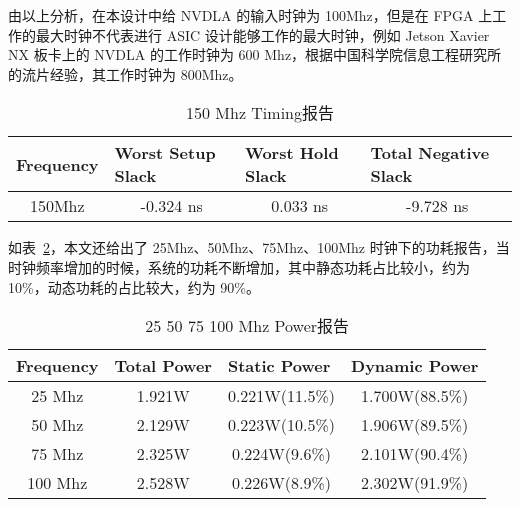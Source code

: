 由以上分析，在本设计中给 NVDLA 的输入时钟为 100Mhz，但是在 FPGA 上工作的最大时钟不代表进行 ASIC 设计能够工作的最大时钟，例如 Jetson Xavier NX 板卡上的 NVDLA 的工作时钟为 600 Mhz，根据中国科学院信息工程研究所的流片经验，其工作时钟为 800Mhz。

\begin{table}[!htbp]
    \caption{150 Mhz Timing报告}
    \label{tab:150 Mhz Timing}
    \centering
    \footnotesize%
    \setlength{\tabcolsep}{4pt}%
    \renewcommand{\arraystretch}{1.2}%
    \begin{tabular}{llll}
        \toprule
        \textbf{Frequency}         & \textbf{Worst Setup Slack}    & \textbf{Worst Hold Slack}    & \textbf{Total Negative Slack} \\
        \midrule
        \multicolumn{1}{c}{150Mhz} & \multicolumn{1}{c}{-0.324 ns} & \multicolumn{1}{c}{0.033 ns} & \multicolumn{1}{c}{-9.728 ns} \\
        \bottomrule                   
    \end{tabular}
\end{table}

如表~\ref{tab:25-100 Mhz Power}，本文还给出了 25Mhz、50Mhz、75Mhz、100Mhz 时钟下的功耗报告，当时钟频率增加的时候，系统的功耗不断增加，其中静态功耗占比较小，约为 10\%，动态功耗的占比较大，约为 90\%。

\begin{table}[!htbp]
    \caption{25 50 75 100 Mhz Power报告}
    \label{tab:25-100 Mhz Power}
    \centering
    \footnotesize%
    \setlength{\tabcolsep}{4pt}%
    \renewcommand{\arraystretch}{1.2}%
    \begin{tabular}{cccc}
        \toprule
        \multicolumn{1}{l}{\textbf{Frequency}} & \multicolumn{1}{l}{\textbf{Total Power}} & \multicolumn{1}{l}{\textbf{Static Power}} & \multicolumn{1}{l}{\textbf{Dynamic Power}} \\
        \midrule
        25 Mhz                                 & 1.921W                                   & 0.221W(11.5\%)                            & 1.700W(88.5\%)                             \\
        50 Mhz                                 & 2.129W                                   & 0.223W(10.5\%)                            & 1.906W(89.5\%)                             \\
        75 Mhz                                 & 2.325W                                   & 0.224W(9.6\%)                             & 2.101W(90.4\%)                             \\
        100 Mhz                                & 2.528W                                   & 0.226W(8.9\%)                             & 2.302W(91.9\%)                             \\
        \bottomrule                   
    \end{tabular}
\end{table}

